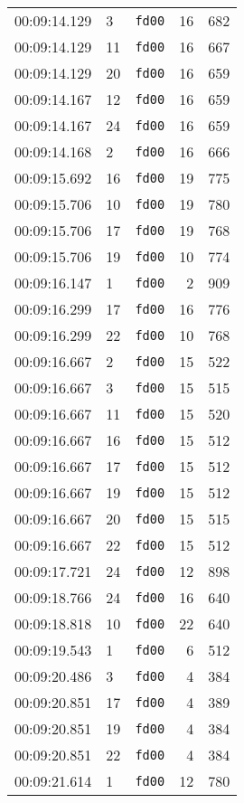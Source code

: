 \documentclass{article}
\begin{document}
\begin{longtable}{lllrr}
00:09:14.129 & 3 & \texttt{fd00} & 16 & 682 \\
00:09:14.129 & 11 & \texttt{fd00} & 16 & 667 \\
00:09:14.129 & 20 & \texttt{fd00} & 16 & 659 \\
00:09:14.167 & 12 & \texttt{fd00} & 16 & 659 \\
00:09:14.167 & 24 & \texttt{fd00} & 16 & 659 \\
00:09:14.168 & 2 & \texttt{fd00} & 16 & 666 \\
00:09:15.692 & 16 & \texttt{fd00} & 19 & 775 \\
00:09:15.706 & 10 & \texttt{fd00} & 19 & 780 \\
00:09:15.706 & 17 & \texttt{fd00} & 19 & 768 \\
00:09:15.706 & 19 & \texttt{fd00} & 10 & 774 \\
00:09:16.147 & 1 & \texttt{fd00} & 2 & 909 \\
00:09:16.299 & 17 & \texttt{fd00} & 16 & 776 \\
00:09:16.299 & 22 & \texttt{fd00} & 10 & 768 \\
00:09:16.667 & 2 & \texttt{fd00} & 15 & 522 \\
00:09:16.667 & 3 & \texttt{fd00} & 15 & 515 \\
00:09:16.667 & 11 & \texttt{fd00} & 15 & 520 \\
00:09:16.667 & 16 & \texttt{fd00} & 15 & 512 \\
00:09:16.667 & 17 & \texttt{fd00} & 15 & 512 \\
00:09:16.667 & 19 & \texttt{fd00} & 15 & 512 \\
00:09:16.667 & 20 & \texttt{fd00} & 15 & 515 \\
00:09:16.667 & 22 & \texttt{fd00} & 15 & 512 \\
00:09:17.721 & 24 & \texttt{fd00} & 12 & 898 \\
00:09:18.766 & 24 & \texttt{fd00} & 16 & 640 \\
00:09:18.818 & 10 & \texttt{fd00} & 22 & 640 \\
00:09:19.543 & 1 & \texttt{fd00} & 6 & 512 \\
00:09:20.486 & 3 & \texttt{fd00} & 4 & 384 \\
00:09:20.851 & 17 & \texttt{fd00} & 4 & 389 \\
00:09:20.851 & 19 & \texttt{fd00} & 4 & 384 \\
00:09:20.851 & 22 & \texttt{fd00} & 4 & 384 \\
00:09:21.614 & 1 & \texttt{fd00} & 12 & 780 \\

\end{longtable}
\end{document}
